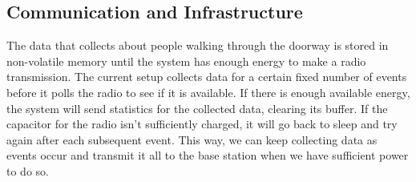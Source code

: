 \subsection{Communication and Infrastructure}
The data that \sysname collects about people walking through the doorway is stored in non-volatile memory until the system has enough energy to make a radio transmission.
The current setup collects data for a certain fixed number of events before it polls the radio to see if it is available.
If there is enough available energy, the system will send statistics for the collected data, clearing its buffer.
If the capacitor for the radio isn't sufficiently charged, it will go back to sleep and try again after each subsequent event.
This way, we can keep collecting data as events occur and transmit it all to the base station when we have sufficient power to do so.


